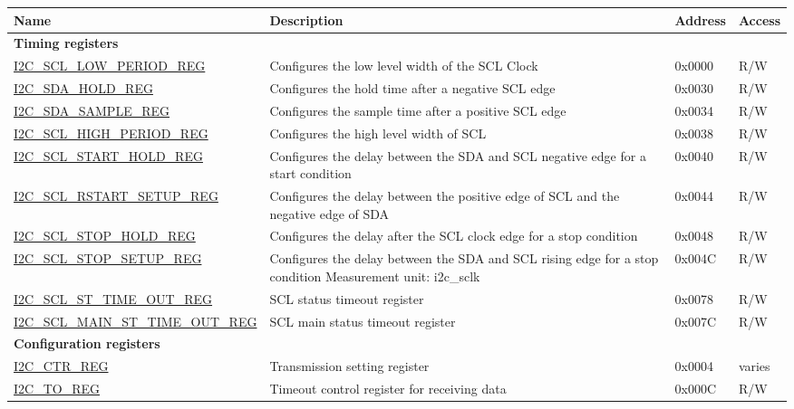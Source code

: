 \begin{longtable}{ | p{6cm} | p{7cm} | p{1.3cm} | p{1cm} | }
\hline\rowcolor{lightgray}
Name & Description &  Address & Access \\ \hline
\endhead
\multicolumn{4}{|l|}{\textbf{Timing registers}} \\ \hline
\hyperref[regdesc:I2CSCLLOWPERIODREG]{I2C\_SCL\_LOW\_PERIOD\_REG} & Configures the low level width of the SCL Clock & 0x0000 & R/W \\ \hline
\hyperref[regdesc:I2CSDAHOLDREG]{I2C\_SDA\_HOLD\_REG} & Configures the hold time after a negative SCL edge & 0x0030 & R/W \\ \hline
\hyperref[regdesc:I2CSDASAMPLEREG]{I2C\_SDA\_SAMPLE\_REG} & Configures the sample time after a positive SCL edge & 0x0034 & R/W \\ \hline
\hyperref[regdesc:I2CSCLHIGHPERIODREG]{I2C\_SCL\_HIGH\_PERIOD\_REG} & Configures the high level width of SCL & 0x0038 & R/W \\ \hline
\hyperref[regdesc:I2CSCLSTARTHOLDREG]{I2C\_SCL\_START\_HOLD\_REG} & Configures the delay between the SDA and SCL negative edge for a start condition & 0x0040 & R/W \\ \hline
\hyperref[regdesc:I2CSCLRSTARTSETUPREG]{I2C\_SCL\_RSTART\_SETUP\_REG} & Configures the delay between the positive edge of SCL and the negative edge of SDA & 0x0044 & R/W \\ \hline
\hyperref[regdesc:I2CSCLSTOPHOLDREG]{I2C\_SCL\_STOP\_HOLD\_REG} & Configures the delay after the SCL clock edge for a stop condition & 0x0048 & R/W \\ \hline
\hyperref[regdesc:I2CSCLSTOPSETUPREG]{I2C\_SCL\_STOP\_SETUP\_REG} & Configures the delay between the SDA and SCL rising edge for a stop condition
Measurement unit: i2c\_sclk & 0x004C & R/W \\ \hline
\hyperref[regdesc:I2CSCLSTTIMEOUTREG]{I2C\_SCL\_ST\_TIME\_OUT\_REG} & SCL status timeout register & 0x0078 & R/W \\ \hline
\hyperref[regdesc:I2CSCLMAINSTTIMEOUTREG]{I2C\_SCL\_MAIN\_ST\_TIME\_OUT\_REG} & SCL main status timeout register & 0x007C & R/W \\ \hline
\multicolumn{4}{|l|}{\textbf{Configuration registers}} \\ \hline
\hyperref[regdesc:I2CCTRREG]{I2C\_CTR\_REG} & Transmission setting register & 0x0004 & varies \\ \hline
\hyperref[regdesc:I2CTOREG]{I2C\_TO\_REG} & Timeout control register for receiving data & 0x000C & R/W \\ \hline

\end{longtable}
